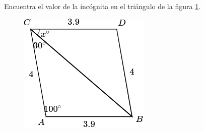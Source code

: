 Encuentra el valor de la incógnita en el triángulo de la figura \ref{fig:angle_triangle_21}.

\begin{minipage}[t][][t]{0.35\textwidth}
    \begin{figure}[H]
        \centering
        \includegraphics[width=0.9\linewidth]{../images/angle_triangle_21.png}

        \caption{}
        \label{fig:angle_triangle_21}
    \end{figure}
\end{minipage}\hfill
\begin{minipage}[t][][t]{0.6\textwidth}
    \begin{solutionbox}{4.5cm}

    \end{solutionbox}
\end{minipage}
